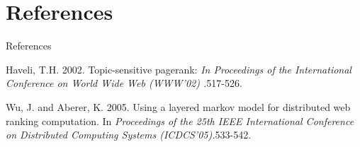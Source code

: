 \documentclass{beamer}
\begin{document}
\section{References}
\begin{frame}{References}


    \begin{thebibliography}{10}
    \beamertemplatearticlebibitems
    Haveli, T.H. 2002. Topic-sensitive pagerank: \emph{In Proceedings of the International Conference on World Wide Web (WWW'02) .}517-526.
    
    \beamertemplatearticlebibitems
     Wu, J. and Aberer, K. 2005. Using a layered markov model for distributed web ranking computation. In \emph{Proceedings of the 25th IEEE International Conference on Distributed Computing Systems (ICDCS'05).}533-542.
    
\end{thebibliography}
\end{frame}
\end{document}
